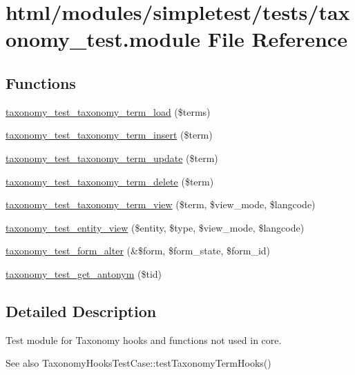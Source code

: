 \hypertarget{taxonomy__test_8module}{
\section{html/modules/simpletest/tests/taxonomy\_\-test.module File Reference}
\label{taxonomy__test_8module}
}
\subsection*{Functions}
\begin{DoxyCompactItemize}
\item 
\hyperlink{taxonomy__test_8module_af46666abf27359dd595d938e7d694c5e}{taxonomy\_\-test\_\-taxonomy\_\-term\_\-load} (\$terms)
\item 
\hyperlink{taxonomy__test_8module_a3f27e9e2da71126683ec0a6939103a87}{taxonomy\_\-test\_\-taxonomy\_\-term\_\-insert} (\$term)
\item 
\hyperlink{taxonomy__test_8module_ae18572695343ab33f33ef409e2301128}{taxonomy\_\-test\_\-taxonomy\_\-term\_\-update} (\$term)
\item 
\hyperlink{taxonomy__test_8module_a9d8897ea32360be0eea901c95ac73ebc}{taxonomy\_\-test\_\-taxonomy\_\-term\_\-delete} (\$term)
\item 
\hyperlink{taxonomy__test_8module_a5bc2b372d22578c4741c2dc9aa0976bb}{taxonomy\_\-test\_\-taxonomy\_\-term\_\-view} (\$term, \$view\_\-mode, \$langcode)
\item 
\hyperlink{taxonomy__test_8module_adbb49d1cf16cc8fef17dfdb6669e5e49}{taxonomy\_\-test\_\-entity\_\-view} (\$entity, \$type, \$view\_\-mode, \$langcode)
\item 
\hyperlink{taxonomy__test_8module_a7e2138428bddc8b571fccfba5208486b}{taxonomy\_\-test\_\-form\_\-alter} (\&\$form, \$form\_\-state, \$form\_\-id)
\item 
\hyperlink{taxonomy__test_8module_a19c6f9c9e801ed9373e8190a678cc2bd}{taxonomy\_\-test\_\-get\_\-antonym} (\$tid)
\end{DoxyCompactItemize}


\subsection{Detailed Description}
Test module for Taxonomy hooks and functions not used in core.

\begin{DoxySeeAlso}{See also}
TaxonomyHooksTestCase::testTaxonomyTermHooks() 
\end{DoxySeeAlso}


